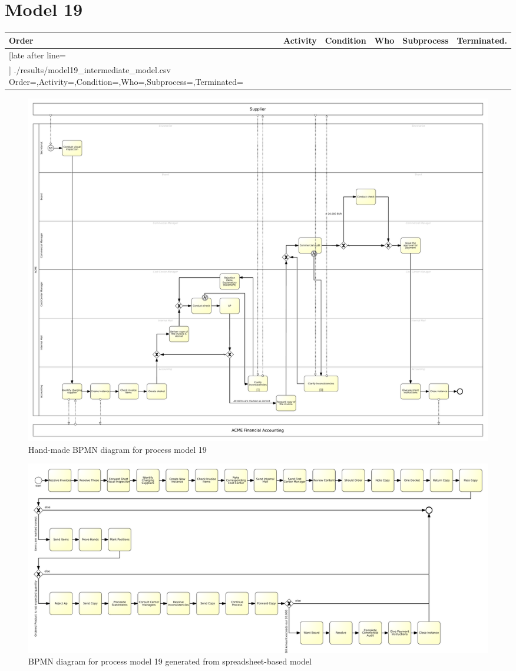 \section{Model 19}
\begin{tcolorbox}[
	breakable,
	arc=0mm,
	left=1pt,
	right = 1pt,
	boxrule=0mm,
	colback = {white},
	]
	\texttt{}
\end{tcolorbox}
\label{txt:model19}
\newpage
{\scriptsize
	\begin{longtable}{|p{0.03 \hsize}|p{0.25 \hsize}|p{0.15 \hsize}|p{0.2 \hsize}|p{0.1 \hsize}|p{0.1 \hsize}|}
		\hline
		Order & Activity & Condition & Who & Subprocess & Terminated.
		\\\hline\hline
		\csvreader[late after line=\\\hline]
		{./results/model19_intermediate_model.csv}
		{Order=\Order,Activity=\Activity,Condition=\Condition,Who=\Who,Subprocess=\Subprocess,Terminated=\Terminated}
		{\Order & \Activity & \Condition & \Who & \Subprocess & \Terminated}
		\caption{Spreadsheet-based description for process model 19}
		\label{csv:model19}
	\end{longtable}
}

\begin{figure}[H]
	\centering
	\includegraphics[width=\hsize]{./bpmn/model19.pdf}
	\caption{Hand-made BPMN diagram for process model 19}
	\label{bpmn:model19}
\end{figure}

\begin{figure}[H]
	\centering
	\includegraphics[width=\hsize]{./generated_bpmn/model19.pdf}
	\caption{BPMN diagram for process model 19 generated from spreadsheet-based model}
	\label{bpmn:generated_model19}
\end{figure}


